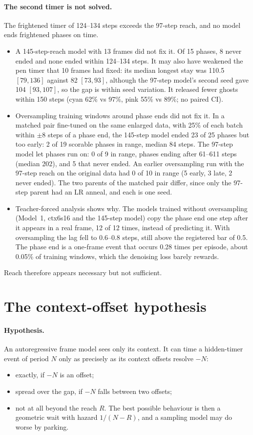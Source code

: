 \documentclass[11pt]{article}
\begin{document}
\paragraph{The second timer is not solved.} The frightened timer of 124--134 steps exceeds the 97-step reach, and
no model ends frightened phases on time.
\begin{itemize}
\item A 145-step-reach model with 13 frames did not fix it. Of 15 phases, 8 never ended and none ended within
124--134 steps. It may also have weakened the pen timer that 10 frames had fixed: its median longest stay was 110.5
$[79, 136]$ against 82 $[73, 93]$, although the 97-step model's second seed gave 104 $[93, 107]$, so the gap is
within seed variation. It released fewer ghosts within 150 steps (cyan 62\% vs 97\%, pink 55\% vs 89\%; no paired
CI).
\item Oversampling training windows around phase ends did not fix it. In a matched pair fine-tuned on the same
enlarged data, with 25\% of each batch within $\pm8$ steps of a phase end, the 145-step model ended 23 of 25 phases
but too early: 2 of 19 scorable phases in range, median 84 steps. The 97-step model let phases run on: 0 of 9 in
range, phases ending after 61--611 steps (median 202), and 5 that never ended. An earlier oversampling run with the
97-step reach on the original data had 0 of 10 in range (5 early, 3 late, 2 never ended). The two parents of the
matched pair differ, since only the 97-step parent had an LR anneal, and each is one seed.
\item Teacher-forced analysis shows why. The models trained without oversampling (Model~1, ctx6s16 and the 145-step
model) copy the phase end one step after it appears in a real frame, 12 of 12 times, instead of predicting it. With
oversampling the lag fell to 0.6--0.8 steps, still above the registered bar of 0.5. The phase end is a one-frame
event that occurs 0.28 times per episode, about 0.05\% of training windows, which the denoising loss barely rewards.
\end{itemize}
Reach therefore appears necessary but not sufficient.

\section{The context-offset hypothesis}
\label{sec:rule}
\paragraph{Hypothesis.} An autoregressive frame model sees only its context. It can time a hidden-timer event of period
$N$ only as precisely as its context offsets resolve $-N$:
\begin{itemize}
\item exactly, if $-N$ is an offset;
\item spread over the gap, if $-N$ falls between two offsets;
\item not at all beyond the reach $R$. The best possible behaviour is then a geometric wait with hazard $1/(N-R)$,
and a sampling model may do worse by parking.
\end{itemize}
\end{document}
